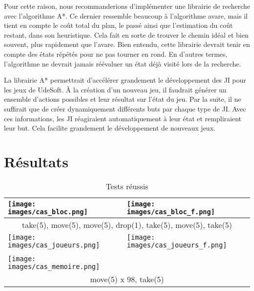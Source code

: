 \documentclass[12pt,letterpaper]{article}
\begin{document}
Pour cette raison, nous recommanderions d'implémenter une librairie de recherche avec l'algorithme A*. Ce dernier ressemble beaucoup à l'algorithme avare, mais il tient en compte le coût total du plan, le passé ainsi que l'estimation du coût restant, dans son heuristique. Cela fait en sorte de trouver le chemin idéal et bien souvent, plus rapidement que l'avare. Bien entendu, cette librairie devrait tenir en compte des états répétés pour ne pas tourner en rond. En d'autres termes, l'algorithme ne devrait jamais réévaluer un état déjà visité lors de la recherche.

La librairie A* permettrait d'accélérer grandement le développement des JI pour les jeux de UdeSoft. À la création d'un nouveau jeu, il faudrait générer un ensemble d'actions possibles et leur résultat sur l'état du jeu. Par la suite, il ne suffirait que de créer dynamiquement différents buts par chaque type de JI. Avec ces informations, les JI réagiraient automatiquement à leur état et rempliraient leur but. Cela facilite grandement le développement de nouveaux jeux.

\section{Résultats} %

\begin{table}
\centering
\begin{tabular}{|p{2.1in}|p{2in}|}
  \hline
  \texttt{[image: images/cas\_bloc.png]} &
    \texttt{[image: images/cas\_bloc\_f.png]} \\ \hline
    \multicolumn{2}{|c|}{take(5), move(5), move(5), drop(1), take(5), move(5), take(5)} \\ \hline
  \texttt{[image: images/cas\_joueurs.png]} &
    \texttt{[image: images/cas\_joueurs\_f.png]} \\ \hline
    \multicolumn{2}{|p{4in}|}{\centering{move(1), move(1), move(1), move(5), move(6), move(3), move(3), move(6), move(5), move(1), move(1), take(1)}} \\ \hline
  \texttt{[image: images/cas\_memoire.png]} & \\ \hline
    \multicolumn{2}{|c|}{move(5) x 98, take(5)} \\ \hline
\end{tabular}
\caption{Tests réussis}
\label{tbl:cas_fonctionnel}
\end{table}
\end{document}
